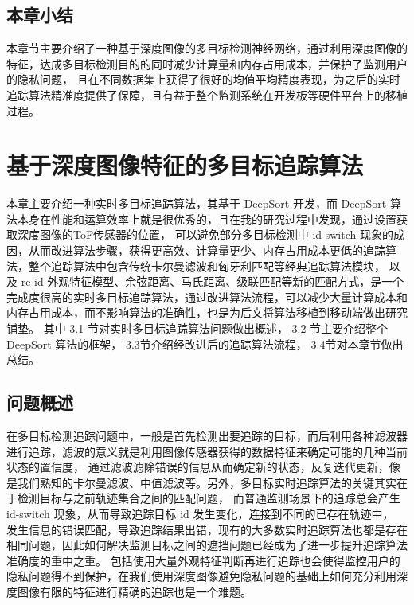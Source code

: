 \section{本章小结}
\label{sec2-5}
本章节主要介绍了一种基于深度图像的多目标检测神经网络，通过利用深度图像的特征，达成多目标检测目的的同时减少计算量和内存占用成本，并保护了监测用户的隐私问题，
且在不同数据集上获得了很好的均值平均精度表现，为之后的实时追踪算法精准度提供了保障，且有益于整个监测系统在开发板等硬件平台上的移植过程。


\chapter{基于深度图像特征的多目标追踪算法}
\label{chap3}
本章主要介绍一种实时多目标追踪算法，其基于 DeepSort 开发，而 DeepSort 算法本身在性能和运算效率上就是很优秀的，且在我的研究过程中发现，通过设置获取深度图像的ToF传感器的位置，
可以避免部分多目标检测中 id-switch 现象的成因，从而改进算法步骤，获得更高效、计算量更少、内存占用成本更低的追踪算法，整个追踪算法中包含传统卡尔曼滤波和匈牙利匹配等经典追踪算法模块，
以及 re-id 外观特征模型、余弦距离、马氏距离、级联匹配等新的匹配方式，是一个完成度很高的实时多目标追踪算法，通过改进算法流程，可以减少大量计算成本和内存占用成本，而不影响算法的准确性，也是为后文将算法移植到移动端做出研究铺垫。
其中 3.1 节对实时多目标追踪算法问题做出概述， 3.2 节主要介绍整个 DeepSort 算法的框架， 3.3节介绍经改进后的追踪算法流程， 3.4节对本章节做出总结。

\vspace{-2mm}
\section{问题概述}
\label{sec3-1}
\vspace{-0.5mm}
在多目标检测追踪问题中，一般是首先检测出要追踪的目标，而后利用各种滤波器进行追踪，滤波的意义就是利用图像传感器获得的数据特征来确定可能的几种当前状态的置信度，
通过滤波滤除错误的信息从而确定新的状态，反复迭代更新，像是我们熟知的卡尔曼滤波、中值滤波等。另外，多目标实时追踪算法的关键其实在于检测目标与之前轨迹集合之间的匹配问题，
而普通监测场景下的追踪总会产生 id-switch 现象，从而导致追踪目标 id 发生变化，连接到不同的已存在轨迹中，
发生信息的错误匹配，导致追踪结果出错，现有的大多数实时追踪算法也都是存在相同问题，因此如何解决监测目标之间的遮挡问题已经成为了进一步提升追踪算法准确度的重中之重。
包括使用大量外观特征判断再进行追踪也会使得监控用户的隐私问题得不到保护，在我们使用深度图像避免隐私问题的基础上如何充分利用深度图像有限的特征进行精确的追踪也是一个难题。

